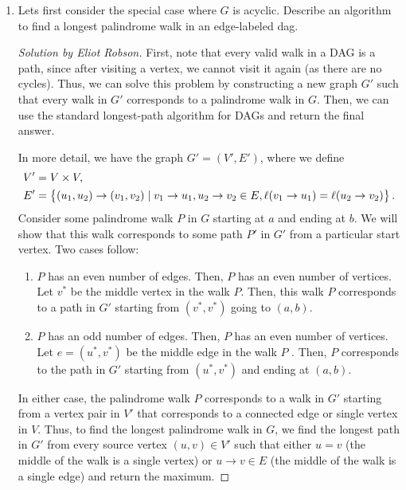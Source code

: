 \documentclass{article}
\newenvironment{solution}[1]{\begin{proof}[Solution by #1]}{\end{proof}}
\begin{document}
\begin{enumerate}
    \item Lets first consider the special case where \(G\) is acyclic. Describe an algorithm to find a longest palindrome walk in an edge-labeled dag.
    
    \begin{solution}{Eliot Robson}
    	First, note that every valid walk in a DAG is a path, since after visiting a vertex, we cannot visit it again (as there are no cycles). Thus, we can solve this problem by constructing a new graph \(G'\) such that every walk in \(G'\) corresponds to a palindrome walk in \(G\). Then, we can use the standard longest-path algorithm for DAGs and return the final answer.
    	
    	In more detail, we have the graph \(G' = (V', E')\), where we define
    	\begin{align*}
    		V' &= V \times V,\\
    		E' &= \set{(u_1, u_2) \to (v_1, v_2) \mid v_1 \to u_1, u_2 \to v_2 \in E, \ell(v_1 \to u_1) = \ell(u_2 \to v_2)}.
    	\end{align*}
    	Consider some palindrome walk \(P\) in \(G\) starting at \(a\) and ending at \(b\). We will show that this walk corresponds to some path \(P'\) in \(G'\) from a particular start vertex. Two cases follow:
        \begin{enumerate}
            \item \(P\) has an even number of edges. Then, \(P\) has an even number of vertices. Let \(v^*\) be the middle vertex in the walk \(P\). Then, this walk \(P\) corresponds to a path in \(G'\) starting from \((v^*, v^*)\) going to \((a,b)\). 
            
            \item \(P\) has an odd number of edges. Then, \(P\) has an even number of vertices. Let \(e = (u^*, v^*)\) be the middle edge in the walk \(P\) . Then, \(P\) corresponds to the path in \(G'\) starting from \((u^*, v^*)\) and ending at \((a,b)\).
        \end{enumerate}
        In either case, the palindrome walk \(P\) corresponds to a walk in \(G'\) starting from a vertex pair in \(V'\) that corresponds to a connected edge or single vertex in \(V\). Thus, to find the longest palindrome walk in \(G\), we find the longest path in \(G'\) from every source vertex \((u,v) \in V'\) such that either \(u = v\) (the middle of the walk is a single vertex) or \(u \to v \in E\) (the middle of the walk is a single edge) and return the maximum.
    \end{solution}
    

\end{enumerate}
\end{document}
